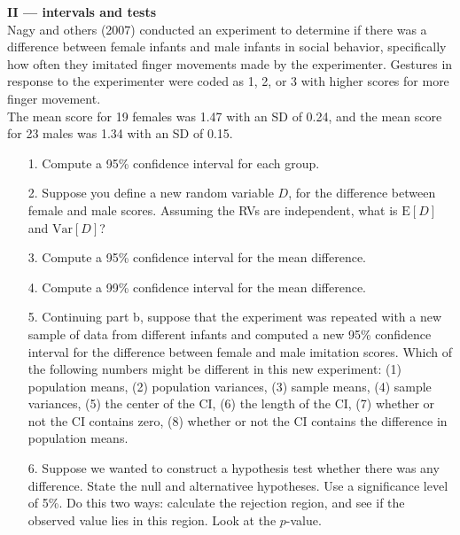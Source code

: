 \documentclass[10pt]{extarticle}
\newcommand{\E}{\text{E}}
\newcommand{\Var}{\text{Var}}
\begin{document}
\hfill 




{\Large \bf II --- intervals and tests} \\ 

Nagy and others (2007) conducted an experiment to determine if there was a difference between female infants and male infants in social behavior, specifically how often they imitated finger movements made by the experimenter. Gestures in response to the experimenter were coded as 1, 2, or 3 with higher scores for more finger movement. \\ 

The mean score for 19 females was 1.47 with an SD of 0.24, and the mean score for 23 males was 1.34 with an SD of 0.15. 

\hfill

\begin{itemize}

	\item[1.] Compute a 95\% confidence interval for each group.  \\ 

	\item[2.] Suppose you define a new random variable $D$, for the difference between female and male scores. Assuming the RVs are independent, what is $\E[D]$ and $\Var[D]$? \\ 

	\item[3.] Compute a 95\% confidence interval for the mean difference. \\ 

	\item[4.] Compute a 99\% confidence interval for the mean difference. \\ 

	\item[5.] Continuing part b, suppose that the experiment was repeated with a new sample of data from different infants and computed a new 95\% confidence interval for the difference between female and male imitation scores. Which of the following numbers might be different in this new experiment: (1) population means, (2) population variances, (3) sample means, (4) sample variances, (5) the center of the CI, (6) the length of the CI, (7) whether or not the CI contains zero, (8) whether or not the CI contains the difference in population means. \\ 

	\item[6.] Suppose we wanted to construct a hypothesis test whether there was any difference. State the null and alternativee hypotheses. Use a significance level of 5\%. Do this two ways: calculate the rejection region, and see if the observed value lies in this region. Look at the $p$-value. 

\end{itemize}
\end{document}
